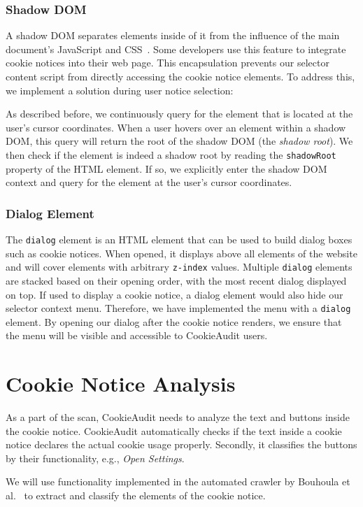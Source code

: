 \subsubsection{Shadow DOM}
A shadow DOM separates elements inside of it from the influence of the main document's JavaScript and CSS~\cite{shadowDomMdn}.
Some developers use this feature to integrate cookie notices into their web page.
This encapsulation prevents our selector content script from directly accessing the cookie notice elements. 
To address this, we implement a solution during user notice selection:

As described before, we continuously query for the element that is located at the user's cursor coordinates.
When a user hovers over an element within a shadow DOM, this query will return the root of the shadow DOM (the \emph{shadow root}). 
We then check if the element is indeed a shadow root by reading the \verb|shadowRoot| property of the HTML element.
If so, we explicitly enter the shadow DOM context and query for the element at the user's cursor coordinates. 


\subsubsection{Dialog Element}
The \verb|dialog| element is an HTML element that can be used to build dialog boxes such as cookie notices.
When opened, it displays above all elements of the website and will cover elements with arbitrary \verb|z-index| values. 
Multiple \verb|dialog| elements are stacked based on their opening order, with the most recent dialog displayed on top.
If used to display a cookie notice, a dialog element would also hide our selector context menu.
Therefore, we have implemented the menu with a \verb|dialog| element.
By opening our dialog after the cookie notice renders, we ensure that the menu will be visible and accessible to CookieAudit users.

\section{Cookie Notice Analysis}
As a part of the scan, CookieAudit needs to analyze the text and buttons inside the cookie notice.
CookieAudit automatically checks if the text inside a cookie notice declares the actual cookie usage properly. Secondly, it classifies the buttons by their functionality, e.g., \emph{Open Settings}.

We will use functionality implemented in the automated crawler by Bouhoula et al.~\cite{bouhoula2023automated} to extract and classify the elements of the cookie notice. 

